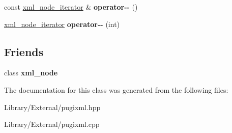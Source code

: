 \begin{DoxyCompactItemize}
\item 
\hypertarget{classpugi_1_1xml__node__iterator_a83ff5311f3d71c127e89a5cf6bf9d361}{}const \hyperlink{classpugi_1_1xml__node__iterator}{xml\+\_\+node\+\_\+iterator} \& {\bfseries operator-\/-\/} ()\label{classpugi_1_1xml__node__iterator_a83ff5311f3d71c127e89a5cf6bf9d361}

\item 
\hypertarget{classpugi_1_1xml__node__iterator_a85c3618b5bb64a3e8695335e80475804}{}\hyperlink{classpugi_1_1xml__node__iterator}{xml\+\_\+node\+\_\+iterator} {\bfseries operator-\/-\/} (int)\label{classpugi_1_1xml__node__iterator_a85c3618b5bb64a3e8695335e80475804}

\end{DoxyCompactItemize}
\subsection*{Friends}
\begin{DoxyCompactItemize}
\item 
\hypertarget{classpugi_1_1xml__node__iterator_a156d917a92815c7b593bd5ef19f6d5fb}{}class {\bfseries xml\+\_\+node}\label{classpugi_1_1xml__node__iterator_a156d917a92815c7b593bd5ef19f6d5fb}

\end{DoxyCompactItemize}


The documentation for this class was generated from the following files\+:\begin{DoxyCompactItemize}
\item 
Library/\+External/pugixml.\+hpp\item 
Library/\+External/pugixml.\+cpp\end{DoxyCompactItemize}
